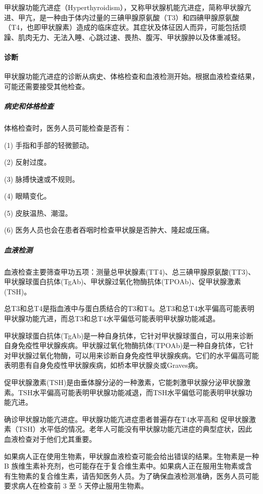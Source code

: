 \documentclass[letterpaper,12pt]{article}
\begin{document}
			甲状腺功能亢进症（Hyperthyroidism），又称甲状腺机能亢进症，简称甲状腺亢进、甲亢，是一种由于体内过量的三碘甲腺原氨酸（T3）和四碘甲腺原氨酸（T4，也即甲状腺素）造成的临床症状。其症状及体征因人而异，可能包括烦躁、肌肉无力、无法入睡、心跳过速、畏热、腹泻、甲状腺肿以及体重减轻。
						
				\paragraph{诊断}\qquad
				
				甲状腺功能亢进症的诊断从病史、体格检查和血液检测开始。根据血液检查结果，可能还需要接受其他检查。
					
					\subparagraph{病史和体格检查}\qquad
					
					体格检查时，医务人员可能检查是否有：
						
					(1) 手指和手部的轻微颤动。
						
					(2) 反射过度。
						
					(3) 脉搏快速或不规则。
						
					(4) 眼睛变化。
						
					(5) 皮肤温热、潮湿。
						
					(6) 医务人员也会在患者吞咽时检查甲状腺是否肿大、隆起或压痛。
						
					\subparagraph{血液检测}\qquad
			
					血液检查主要筛查甲功五项：测量总甲状腺素(TT4)、总三碘甲腺原氨酸(TT3)、甲状腺球蛋白抗体(TgAb)、甲状腺过氧化物酶抗体(TPOAb)、促甲状腺激素(TSH)。
						
					总T3和总T4是指血液中与蛋白质结合的T3和T4。总T3和总T4水平偏高可能表明甲状腺功能亢进，而总T3和总T4水平偏低可能表明甲状腺功能减退。
					
					甲状腺球蛋白抗体(TgAb)是一种自身抗体，它针对甲状腺球蛋白，可以用来诊断自身免疫性甲状腺疾病。甲状腺过氧化物酶抗体(TPOAb)是一种自身抗体，它针对甲状腺过氧化物酶，可以用来诊断自身免疫性甲状腺疾病。它们的水平偏高可能表明患有自身免疫性甲状腺疾病，如桥本甲状腺炎或Graves病。
						
					促甲状腺激素(TSH)是由垂体腺分泌的一种激素，它能刺激甲状腺分泌甲状腺激素。TSH水平偏高可能表明甲状腺功能减退，而TSH水平偏低可能表明甲状腺功能亢进。
	
					确诊甲状腺功能亢进症。甲状腺功能亢进症患者普遍存在T4水平高和 促甲状腺激素（TSH）水平低的情况。老年人可能没有甲状腺功能亢进症的典型症状，因此血液检查对于他们尤其重要。
						
					如果病人正在使用生物素，甲状腺血液检查可能会给出错误的结果。生物素是一种 B 族维生素补充剂，也可能存在于复合维生素中。如果病人正在服用生物素或含有生物素的复合维生素，请告知医务人员。为了确保血液检测准确，医务人员可能要求病人在检查前 3 至 5 天停止服用生物素。
						
\end{document}
